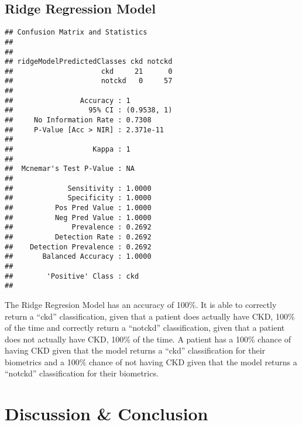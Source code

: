 \documentclass[
]{article}
\newenvironment{Shaded}{\begin{snugshade}}{\end{snugshade}}
\newcommand{\FunctionTok}[1]{\textcolor[rgb]{0.00,0.00,0.00}{#1}}
\newcommand{\NormalTok}[1]{#1}
\newcommand{\SpecialCharTok}[1]{\textcolor[rgb]{0.00,0.00,0.00}{#1}}
\begin{document}
\hypertarget{ridge-regression-model-1}{%
\subsection{Ridge Regression Model}\label{ridge-regression-model-1}}

\begin{Shaded}
\end{Shaded}

\begin{verbatim}
## Confusion Matrix and Statistics
## 
##                           
## ridgeModelPredictedClasses ckd notckd
##                     ckd     21      0
##                     notckd   0     57
##                                      
##                Accuracy : 1          
##                  95% CI : (0.9538, 1)
##     No Information Rate : 0.7308     
##     P-Value [Acc > NIR] : 2.371e-11  
##                                      
##                   Kappa : 1          
##                                      
##  Mcnemar's Test P-Value : NA         
##                                      
##             Sensitivity : 1.0000     
##             Specificity : 1.0000     
##          Pos Pred Value : 1.0000     
##          Neg Pred Value : 1.0000     
##              Prevalence : 0.2692     
##          Detection Rate : 0.2692     
##    Detection Prevalence : 0.2692     
##       Balanced Accuracy : 1.0000     
##                                      
##        'Positive' Class : ckd        
## 
\end{verbatim}

The Ridge Regresion Model has an accuracy of 100\%. It is able to
correctly return a ``ckd'' classification, given that a patient does
actually have CKD, 100\% of the time and correctly return a ``notckd''
classification, given that a patient does not actually have CKD, 100\%
of the time. A patient has a 100\% chance of having CKD given that the
model returns a ``ckd'' classification for their biometrics and a 100\%
chance of not having CKD given that the model returns a ``notckd''
classification for their biometrics.

\hypertarget{discussion-conclusion}{%
\section{Discussion \& Conclusion}\label{discussion-conclusion}}
\end{document}
